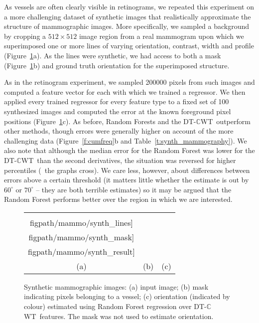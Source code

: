 \documentclass[10pt,twocolumn,letterpaper]{article}
\newcommand{\fref}[1]{Figure~\ref{#1}}
\newcommand{\tref}[1]{Table~\ref{#1}}
\def\dtcwt{DT-$\mathbb{C}$WT}
\newcommand{\comment}[1]{}
\begin{document}
\comment{The images don't look very mammogram-like - in what way can you justify this claim? Give references (e.g. Mike's thesis)}

As vessels are often clearly visible in retinograms, we repeated this experiment on a more challenging dataset of synthetic images that realistically approximate the structure of mammographic images. More specifically, we sampled a background by cropping a $512{\times}512$ image region from a real mammogram upon which we superimposed one or more lines of varying orientation, contrast, width and profile (\fref{f:synth_mammography}a). As the lines were synthetic, we had access to both a mask (\fref{f:synth_mammography}b) and ground truth orientation for the superimposed structure.

As in the retinogram experiment, we sampled 200000 pixels from such images and computed a feature vector for each with which we trained a regressor. We then applied every trained regressor for every feature type to a fixed set of 100 synthesized images and computed the error at the known foreground pixel positions (\fref{f:synth_mammography}c). As before, Random Forests and the \dtcwt~outperform other methods, though errors were generally higher on account of the more challenging data (\fref{f:cumfreq}b and \tref{t:synth_mammography}). We also note that although the median error for the Random Forest was lower for the \dtcwt~than the second derivatives, the situation was reversed for higher percentiles (\ie~the graphs cross). We care less, however, about differences between errors above a certain threshold (it matters little whether the estimate is out by $60^\circ$ or $70^\circ$ -- they are both terrible estimates) so it may be argued that the Random Forest performs better over the region in which we are interested.

\begin{figure}[t]
\centering
\begin{tabular}{c c c}
\texttt{[image: \\figpath/mammo/synth\_lines]} &
\texttt{[image: \\figpath/mammo/synth\_mask]} &
\texttt{[image: \\figpath/mammo/synth\_result]} \\
(a) & (b) & (c)
\end{tabular}
%
\caption{Synthetic mammographic images: %
(a) input image; %
(b) mask indicating pixels belonging to a vessel; %
(c) orientation (indicated by colour) estimated using Random Forest regression over \dtcwt~features. The mask was not used to estimate orientation.%
}
\label{f:synth_mammography}
\end{figure}
\end{document}
